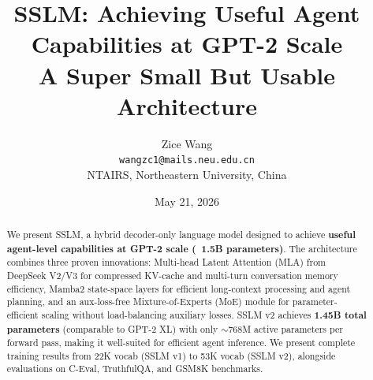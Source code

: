 \documentclass[11pt,a4paper]{article}
\title{\textbf{SSLM: Achieving Useful Agent Capabilities at GPT-2 Scale} \\
\Large{A Super Small But Usable Architecture}}
\author{
    Zice Wang \\
    \texttt{wangzc1@mails.neu.edu.cn} \\
    NTAIRS, Northeastern University, China \\
}
\date{May 21, 2026}
\begin{document}
\maketitle

\begin{abstract}
We present SSLM, a hybrid decoder-only language model designed to achieve \textbf{useful agent-level capabilities at GPT-2 scale (~1.5B parameters)}. The architecture combines three proven innovations: Multi-head Latent Attention (MLA) from DeepSeek V2/V3 for compressed KV-cache and multi-turn conversation memory efficiency, Mamba2 state-space layers for efficient long-context processing and agent planning, and an aux-loss-free Mixture-of-Experts (MoE) module for parameter-efficient scaling without load-balancing auxiliary losses. SSLM v2 achieves \textbf{1.45B total parameters} (comparable to GPT-2 XL) with only $\sim$768M active parameters per forward pass, making it well-suited for efficient agent inference. We present complete training results from 22K vocab (SSLM v1) to 53K vocab (SSLM v2), alongside evaluations on C-Eval, TruthfulQA, and GSM8K benchmarks.
\end{abstract}













\end{document}
